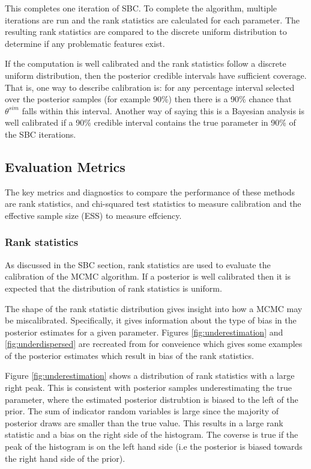 \documentclass[12pt, a4paper]{article}
\begin{document}
        This completes one iteration of SBC. To complete the algorithm, multiple iterations are run and the rank statistics are calculated for each parameter. The resulting rank statistics are compared to the discrete uniform distribution to determine if any problematic features exist.

        If the computation is well calibrated and the rank statistics follow a discrete uniform distribution, then the posterior credible intervals have sufficient coverage. That is, one way to describe calibration is: for any percentage interval selected over the posterior samples (for example 90\%) then there is a 90\% chance that $\theta^{sim}$ falls within this interval. Another way of saying this is a Bayesian analysis is well calibrated if a 90\% credible interval contains the true parameter in 90\% of the SBC iterations. 

    \subsection{Evaluation Metrics}
        The key metrics and diagnostics to compare the performance of these methods are rank statistics, and chi-squared test statistics to measure calibration and the effective sample size (ESS) to measure effciency.

        \subsubsection{Rank statistics}
            As discussed in the SBC section, rank statistics are used to evaluate the calibration of the MCMC algorithm. If a posterior is well calibrated then it is expected that the distribution of rank statistics is uniform.

            The shape of the rank statistic distribution gives insight into how a MCMC may be miscalibrated. Specifically, it gives information about the type of bias in the posterior estimates for a given parameter. Figures \ref{fig:underestimation} and \ref{fig:underdispersed} are recreated from \citet{talts2018validating} for conveience which gives some examples of the posterior estimates which result in bias of the rank statistics.

            Figure \ref{fig:underestimation} shows a distribution of rank statistics with a large right peak. This is consistent with posterior samples underestimating the true parameter, where the estimated posterior distrubtion is biased to the left of the prior. The sum of indicator random variables is large since the majority of posterior draws are smaller than the true value. This results in a large rank statistic and a bias on the right side of the histogram. The coverse is true if the peak of the histogram is on the left hand side (i.e the posterior is biased towards the right hand side of the prior). 
\end{document}
